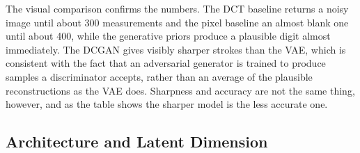The visual comparison confirms the numbers. The DCT baseline returns a noisy image until about 300 measurements and the pixel baseline an almost blank one until about 400, while the generative priors produce a plausible digit almost immediately. The DCGAN gives visibly sharper strokes than the VAE, which is consistent with the fact that an adversarial generator is trained to produce samples a discriminator accepts, rather than an average of the plausible reconstructions as the VAE does. Sharpness and accuracy are not the same thing, however, and as the table shows the sharper model is the less accurate one.

\subsection{Architecture and Latent Dimension}

